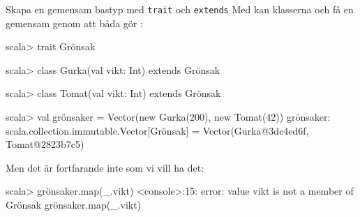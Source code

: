 \begin{Slide}{Skapa en gemensam bastyp med \texttt{trait} och \texttt{extends}}\SlideFontSmall
Med  kan klasserna  och  få en gemensam  genom att båda  gör :
\begin{REPL}
scala> trait Grönsak

scala> class Gurka(val vikt: Int) extends Grönsak

scala> class Tomat(val vikt: Int) extends Grönsak

scala> val grönsaker = Vector(new Gurka(200), new Tomat(42))
grönsaker: scala.collection.immutable.Vector[Grönsak] =
  Vector(Gurka@3dc4ed6f, Tomat@2823b7c5)


\end{REPL}
\pause
Men det är fortfarande inte som vi vill ha det:
\begin{REPLnonum}
scala> grönsaker.map(_.vikt)
<console>:15: error: value vikt is not a member of Grönsak
       grönsaker.map(_.vikt)
\end{REPLnonum}
\end{Slide}



